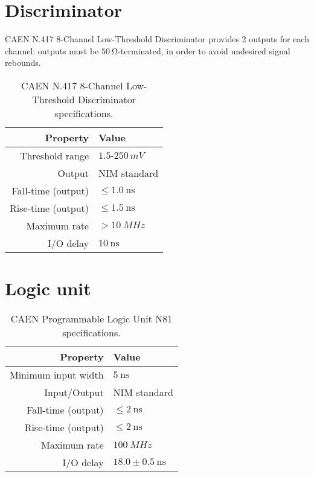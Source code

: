 \section{Discriminator} \label{app:discriminator}
CAEN N.417 8-Channel Low-Threshold Discriminator provides 2 outputs for each channel: outputs must be $\SI{50}{\ohm}$-terminated, in order to avoid undesired signal rebounds.

\begin{table}[!htp]
	\centering
	\begin{tabular}{rl}
		\toprule
		Property	&	Value \\
		\midrule
		Threshold range	&	$1.5\textrm{-}250\,\si{mV}$ \\
		Output 	& NIM standard\\
		Fall-time (output)	&	$\leq \SI{1.0}{\nano\second}$\\
		Rise-time (output)	&	$\leq \SI{1.5}{\nano\second}$\\
		Maximum rate	&	$> \SI{10}{MHz}$\\
		I/O delay	&	$\SI{10}{\nano\second}$\\
		\bottomrule		
	\end{tabular}
	\caption{CAEN N.417 8-Channel Low-Threshold Discriminator specifications.}
\end{table}

\section{Logic unit} \label{app:logic}


\begin{table}[!htp]
	\centering
	\begin{tabular}{rl}
		\toprule
		Property & Value 	 \\
		\midrule
		Minimum input width &  $\SI{5}{\nano\second} $\\
		Input/Output	&	NIM standard \\
		Fall-time (output)	&	$\leq \SI{2}{\nano\second}$\\
		Rise-time (output)	&	$\leq \SI{2}{\nano\second}$\\
		Maximum rate	&	$ \SI{100}{MHz}$\\
		I/O delay	&	$18.0\pm\SI{0.5}{\nano\second}$\\
		\bottomrule		
	\end{tabular}
	\caption{CAEN Programmable Logic Unit N81 specifications.}
\end{table}

\newpage

